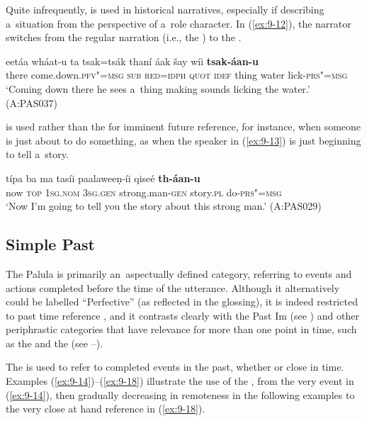 Quite infrequently,  is used in historical narratives, especially if describing a~situation from the perspective of a~role character. In (\ref{ex:9-12}), the narrator switches from the regular narration  (i.e., the ) to the .

\ea
\label{ex:9-12}
\gll eetáa wháat-u ta tsak=tsák thaní áak šay wíi \textbf{tsak-áan-u}\\
there come.down.\textsc{pfv"=msg} \textsc{sub} \textsc{red}=\textsc{idph} \textsc{quot} \textsc{idef}  thing water lick-\textsc{prs"=msg}\\
\glt `Coming down there he sees a~thing making sounds licking the water.' (A:PAS037)
\z

 is used rather than the  for imminent future reference, for instance, when someone is just about to do something, as when the speaker in (\ref{ex:9-13}) is just beginning to tell a~story.

\begin{exe}
\ex
\label{ex:9-13}
\gll típa ba ma tasíi paalaweeṇ-íi qiseé \textbf{th-áan-u} \\
now \textsc{top} 1\textsc{sg.nom} 3\textsc{sg.gen} strong.man-\textsc{gen} story.\textsc{pl} do-\textsc{prs"=msg} \\
\glt `Now I'm going to tell you the story about this strong man.' (A:PAS029)
\end{exe}

\subsection{Simple Past}
\label{subsec:9-1-4}


The Palula  is primarily an~aspectually defined category, referring to events and actions completed before the time of the utterance. Although it alternatively could be labelled ``Perfective'' (as reflected in the glossing), it is indeed restricted to past time reference \citep[79]{dahl1985}, and it contrasts clearly with the Past Im (see ) and other periphrastic categories that have relevance for more than one point in time, such as the  and the  (see --).



The  is used to refer to completed events in the past, whether  or close in time. Examples (\ref{ex:9-14})--(\ref{ex:9-18}) illustrate the use of the , from the very  event in (\ref{ex:9-14}), then gradually decreasing in remoteness in the following examples to the very close at hand reference in (\ref{ex:9-18}).

